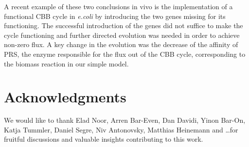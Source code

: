 \documentclass[a4page,notitlepage]{article}
\begin{document}
A recent example of these two conclusions in vivo is the implementation of a functional CBB cycle in \emph{e.coli} by introducing the two genes missing for its functioning.
The successful introduction of the genes did not suffice to make the cycle functioning and further directed evolution was needed in order to achieve non-zero flux.
A key change in the evolution was the decrease of the affinity of PRS, the enzyme responsible for the flux out of the CBB cycle, corresponding to the biomass reaction in our simple model.
\section{Acknowledgments}
We would like to thank Elad Noor, Arren Bar-Even, Dan Davidi, Yinon Bar-On, Katja Tummler, Daniel Segre, Niv Antonovsky, Matthias Heinemann and \dots for fruitful discussions and valuable insights contributing to this work.
{}

\end{document}
